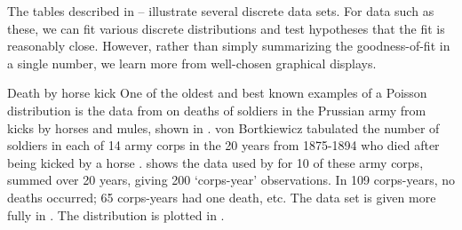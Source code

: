 The tables described in -- illustrate several discrete data sets. For data such as these,
we can fit various discrete distributions and test hypotheses that
the fit is reasonably close.
However, rather than simply summarizing the goodness-of-fit in a
single number, we learn more from well-chosen graphical displays.

\begin{Example}[horskick1]{Death by horse kick}
One of the oldest and best known examples of a Poisson distribution
is the data from
\citet{Bortkiewicz:98} on deaths of soldiers in the Prussian
army from kicks by horses and mules, shown in .
von Bortkiewicz tabulated the number of soldiers in each of
14 army corps in the 20 years from 1875-1894
who died after being kicked by a horse
\citep[p. 18]{AndrewsHerzberg:85}.
 shows the data used by
\citet{Fisher:25} for 10 of these
army corps, summed over 20 years, giving 200
`corps-year' observations.  In 109 corps-years,
no deaths occurred; 65 corps-years had one death, etc.
The data set is given more fully in .
The distribution is plotted in .

\end{Example}

